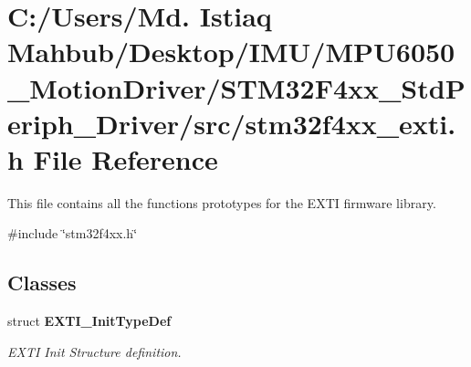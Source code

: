\section{C\+:/\+Users/\+Md. Istiaq Mahbub/\+Desktop/\+I\+M\+U/\+M\+P\+U6050\+\_\+\+Motion\+Driver/\+S\+T\+M32\+F4xx\+\_\+\+Std\+Periph\+\_\+\+Driver/src/stm32f4xx\+\_\+exti.h File Reference}
\label{stm32f4xx__exti_8h}


This file contains all the functions prototypes for the E\+X\+TI firmware library.  


{\ttfamily \#include \char`\"{}stm32f4xx.\+h\char`\"{}}\newline
\subsection*{Classes}
\begin{DoxyCompactItemize}
\item 
struct \textbf{ E\+X\+T\+I\+\_\+\+Init\+Type\+Def}
\begin{DoxyCompactList}\small\item\em E\+X\+TI Init Structure definition. \end{DoxyCompactList}\end{DoxyCompactItemize}
